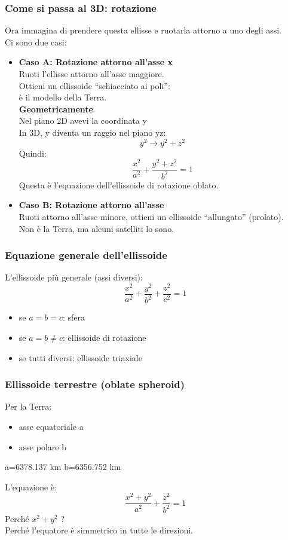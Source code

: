 \documentclass[a4paper,14pt]{article}
\begin{document}
\subsubsection{Come si passa al 3D: rotazione}
Ora immagina di prendere questa ellisse e ruotarla attorno a uno degli assi.\\
Ci sono due casi:\\
\begin{itemize}
\item \textbf{Caso A: Rotazione attorno all’asse x} \\
Ruoti l’ellisse attorno all’asse maggiore.\\
Ottieni un ellissoide “schiacciato ai poli”:\\
è il modello della Terra.\\
\textbf{Geometricamente}\\
Nel piano 2D avevi la coordinata y\\
In 3D, y diventa un raggio nel piano yz:\\
\[ y^2 \rightarrow y^2+z^2 \]
Quindi:\\
\[\frac{x^2}{a^2}+\frac{y^2+z^2}{b^2}=1\]
Questa è l’equazione dell’ellissoide di rotazione oblato.\\
\item \textbf{Caso B: Rotazione attorno all’asse} \\
Ruoti attorno all’asse minore, ottieni un ellissoide “allungato” (prolato).\\
Non è la Terra, ma alcuni satelliti lo sono.\\
\end{itemize}
\subsubsection{Equazione generale dell’ellissoide}
L’ellissoide più generale (assi diversi):\\
\[ \frac{x^2}{a^2}+\frac{y^2}{b^2}+\frac{z^2}{c^2}=1 \]
\begin{itemize}
\item se \(a=b=c\): sfera
\item se \(a=b\neq c\): ellissoide di rotazione
\item se tutti diversi: ellissoide triaxiale
\end{itemize}
\subsubsection{Ellissoide terrestre (oblate spheroid)}
Per la Terra:
\begin{itemize}
\item asse equatoriale a
\item asse polare b
\end{itemize}
\begin{center}
a=6378.137 km
b=6356.752 km
\end{center}
L’equazione è:
\[ \frac{x^2+y^2}{a^2}+\frac{z^2}{b^2}=1 \]
Perché \(x^2+y^2\) ?\\
Perché l’equatore è simmetrico in tutte le direzioni.
\end{document}
